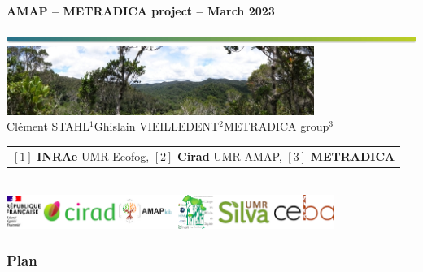 {
  \begin{frame}
  
  \begin{center}
  \small{\textbf{AMAP -- METRADICA project -- March 2023}}
  \end{center}
  \vspace{-1cm}
  \titlepage %
  \vspace{-3.5cm}
  \begin{center}
    \includegraphics[width=\textwidth]{figs/Barre_couleur}\\
    \vspace{0.5cm}
    \includegraphics[width=10cm]{figs/Banniere}\\
    \vspace{0.3cm}
    \small{Clément STAHL$^{1}$\hspace{0.25cm}Ghislain VIEILLEDENT$^{2}$\hspace{0.25cm}METRADICA group$^{3}$}\\
    \vspace{0.15cm}
    {\scriptsize
      \begin{tabular}{l}
        $[1]$ \textbf{INRAe} UMR Ecofog, $[2]$ \textbf{Cirad} UMR AMAP, $[3]$ \textbf{METRADICA}
      \end{tabular}
    }\\
    \vspace{0.3cm}
    \includegraphics[width=0.80\textwidth]{figs/partners_logos}
    
  \end{center}
  \end{frame}
}


\placelogotrue
\begin{frame}
  \frametitle{Plan}
  \begin{columns}[c]
    \begin{column}{0.5\textwidth}
      \tableofcontents[sections=1]
      \vspace{0.5cm}
      \tableofcontents[sections=2]
    \end{column}
    \begin{column}{0.5\textwidth}
        \tableofcontents[sections=3]
        \vspace{0.5cm}
        \tableofcontents[sections=4]
    \end{column}
  \end{columns}
\end{frame}
\placelogofalse